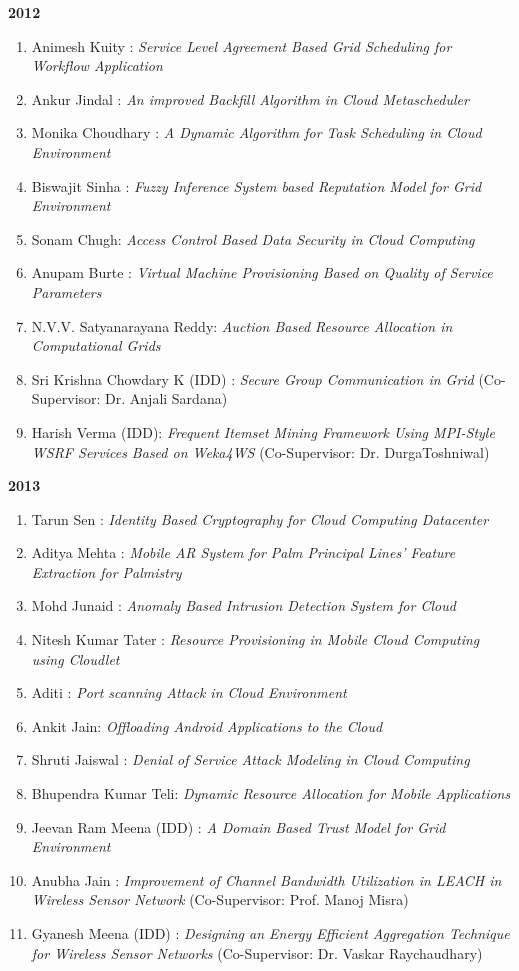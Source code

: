 
\textbf{2012}
\begin{enumerate} [label=(MT\arabic*).]	
\item	Animesh Kuity : 	\textit{Service Level Agreement Based Grid Scheduling for Workflow Application}
\item	Ankur Jindal : 	\textit{	An improved Backfill Algorithm in Cloud Metascheduler}
\item	Monika Choudhary : 	\textit{	A Dynamic Algorithm for Task Scheduling in Cloud Environment}	
\item	Biswajit Sinha : 	\textit{	Fuzzy Inference System based Reputation Model for Grid Environment} 
\item	Sonam Chugh: 	\textit{	Access Control Based Data Security in Cloud Computing} 
\item	Anupam Burte : 	\textit{	Virtual Machine Provisioning Based on Quality of Service Parameters}	
\item	N.V.V. Satyanarayana Reddy: 	\textit{	Auction Based Resource Allocation in Computational Grids	} 
\item   Sri Krishna Chowdary K (IDD) : 	\textit{	Secure Group Communication in Grid}  (Co-Supervisor: Dr. Anjali Sardana) 
\item	Harish Verma (IDD): 	\textit{	Frequent Itemset Mining Framework Using MPI-Style WSRF Services Based on Weka4WS} (Co-Supervisor: Dr. DurgaToshniwal)
\end{enumerate}



\textbf{2013}



\begin{enumerate}[label=(MT\arabic*)., resume]
\item	Tarun Sen : 	\textit{	Identity Based Cryptography for Cloud Computing Datacenter}	 
\item	Aditya Mehta : 	\textit{	Mobile AR System for Palm Principal Lines' Feature Extraction for Palmistry} 
\item		Mohd Junaid : 	\textit{	Anomaly Based Intrusion Detection System for Cloud}	
\item		Nitesh Kumar Tater : 	\textit{	Resource Provisioning in Mobile Cloud Computing using Cloudlet}
\item		Aditi : 	\textit{	Port scanning Attack in Cloud Environment} 
\item		Ankit Jain: 	\textit{	Offloading Android Applications to the Cloud}
\item		Shruti Jaiswal : 	\textit{	Denial of Service Attack Modeling in Cloud Computing}
\item		Bhupendra Kumar Teli: 	\textit{	Dynamic Resource Allocation for Mobile Applications}
\item		Jeevan Ram Meena (IDD) : 	\textit{	A Domain Based Trust Model for Grid Environment}
\item		Anubha Jain : 	\textit{	 Improvement of Channel Bandwidth Utilization in LEACH in Wireless Sensor Network} (Co-Supervisor:	Prof. Manoj Misra)	
\item		Gyanesh Meena (IDD) : 	\textit{	Designing an Energy Efficient Aggregation Technique for Wireless Sensor Networks} (Co-Supervisor: Dr. Vaskar Raychaudhary)
\end{enumerate}

